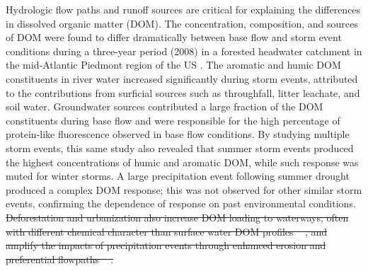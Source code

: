 \documentclass[preprint,review, 12pt]{elsarticle}
\providecommand{\DIFdel}[1]{{\protect\color{red}\sout{#1}}}                      %
\providecommand{\DIFdelbegin}{} %
\providecommand{\DIFdelend}{} %
\newcommand{\DIFscaledelfig}{0.5}
\newlength{\DIFdelgraphicswidth} %
\newlength{\DIFdelgraphicsheight} %
\newcommand{\DIFdelincludegraphics}[2][]{%
\sbox{\DIFdelgraphicsbox}{\DIFOincludegraphics[#1]{#2}}%
\settoboxwidth{\DIFdelgraphicswidth}{\DIFdelgraphicsbox} %
\settoboxtotalheight{\DIFdelgraphicsheight}{\DIFdelgraphicsbox} %
\scalebox{\DIFscaledelfig}{%
\parbox[b]{\DIFdelgraphicswidth}{\usebox{\DIFdelgraphicsbox}\\[-\baselineskip] \rule{\DIFdelgraphicswidth}{0em}}\llap{\resizebox{\DIFdelgraphicswidth}{\DIFdelgraphicsheight}{%
\setlength{\unitlength}{\DIFdelgraphicswidth}%
\begin{picture}(1,1)%
\thicklines\linethickness{2pt} %
{\color[rgb]{1,0,0}\put(0,0){\framebox(1,1){}}}%
{\color[rgb]{1,0,0}\put(0,0){\line( 1,1){1}}}%
{\color[rgb]{1,0,0}\put(0,1){\line(1,-1){1}}}%
\end{picture}%
}\hspace*{3pt}}} %
} %
\DeclareRobustCommand{\DIFdelbegin}{\DIFOdelbegin \let\includegraphics\DIFdelincludegraphics} %
\DeclareRobustCommand{\DIFdelend}{\DIFOaddend \let\includegraphics\DIFOincludegraphics} %
\begin{document}
Hydrologic flow paths and runoff sources are critical for explaining the differences in dissolved organic matter (DOM). The concentration, composition, and sources of DOM were found to differ dramatically between base flow and storm event conditions during a three{-}year period (2008) in a forested headwater catchment in the mid{‐}Atlantic Piedmont region of the US \citep{Inamdar2011}. The aromatic and humic DOM constituents in river water increased significantly during storm events, attributed to the contributions from surficial sources such as throughfall, litter leachate, and soil water. Groundwater sources contributed a large fraction of the DOM constituents during base flow and were responsible for the high percentage of protein‐like fluorescence observed in base flow conditions. By studying multiple storm events, this same study \citep{Inamdar2011} also revealed that summer storm events produced the highest concentrations of humic and aromatic DOM, while such response was muted for winter storms. A large precipitation event following summer drought produced a complex DOM response; this was not observed for other similar storm events, confirming the dependence of response on past environmental conditions. 
\DIFdelbegin \DIFdel{Deforestation and urbanization also increase DOM loading to waterways, often with different chemical character than surface water DOM profiles \mbox{%
\citep{Williams2010, Wilson2009, Fu2007, McEnroe2013}}\hspace{0pt}%
, and amplify the impacts of precipitation events through enhanced erosion and preferential flowpaths \mbox{%
\citep{Burns2012, Heaney1984, Paul2001, Hawley2016}}\hspace{0pt}%
.
}\DIFdelend 
\end{document}
